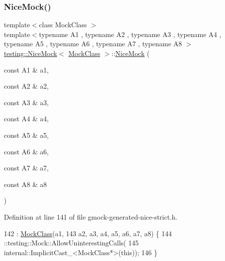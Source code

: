 \subsubsection{\texorpdfstring{Nice\+Mock()}{NiceMock()}\hspace{0.1cm}{\footnotesize\ttfamily [9/11]}}
{\footnotesize\ttfamily template$<$class Mock\+Class $>$ \\
template$<$typename A1 , typename A2 , typename A3 , typename A4 , typename A5 , typename A6 , typename A7 , typename A8 $>$ \\
\hyperlink{classtesting_1_1NiceMock}{testing\+::\+Nice\+Mock}$<$ \hyperlink{classMockClass}{Mock\+Class} $>$\+::\hyperlink{classtesting_1_1NiceMock}{Nice\+Mock} (\begin{DoxyParamCaption}\item[{const A1 \&}]{a1,  }\item[{const A2 \&}]{a2,  }\item[{const A3 \&}]{a3,  }\item[{const A4 \&}]{a4,  }\item[{const A5 \&}]{a5,  }\item[{const A6 \&}]{a6,  }\item[{const A7 \&}]{a7,  }\item[{const A8 \&}]{a8 }\end{DoxyParamCaption})\hspace{0.3cm}{\ttfamily [inline]}}



Definition at line 141 of file gmock-\/generated-\/nice-\/strict.\+h.


\begin{DoxyCode}
142                                                               : \hyperlink{classMockClass}{MockClass}(a1,
143       a2, a3, a4, a5, a6, a7, a8) \{
144     ::testing::Mock::AllowUninterestingCalls(
145         internal::ImplicitCast\_<MockClass*>(\textcolor{keyword}{this}));
146   \}
\end{DoxyCode}
\mbox{\label{classtesting_1_1NiceMock_a61cfc9282222928590bcdaf851a806c6}} 
